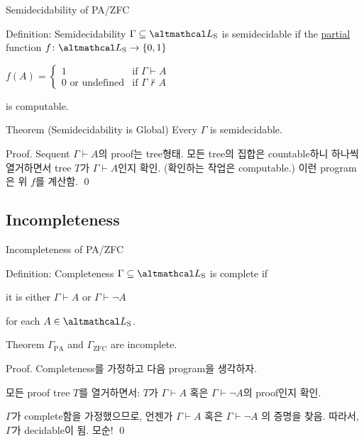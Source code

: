 \documentclass[../231120_msquare_computational-logic.tex]{subfiles}
\begin{document}
\begin{frame}{Semidecidability of PA/ZFC}
    \begin{block}{Definition: Semidecidability}
        \(\Gamma \subseteq \LS\) is semidecidable if the \ul{partial} function \(f \colon \LS \to \{0,1\}\)
        \centerline{
            \(f(A) = \begin{cases}
                1 & \text{if } \Gamma \vdash A \\
                0 \text{ or undefined} & \text{if }\Gamma \not\vdash A
            \end{cases}\)
        }
        is computable.
    \end{block}
    \pause

    \begin{block}{Theorem (Semidecidability is Global)}
        Every \(\Gamma\) is semidecidable.
    \end{block}
    \begin{block}{Proof.}
        Sequent \(\Gamma \vdash A\)의 proof는 tree형태.
        모든 tree의 집합은 countable하니 하나씩 열거하면서
        tree \(T\)가 \(\Gamma \vdash A\)인지 확인. (확인하는 작업은 computable.)
        이런 program은 위 \(f\)를 계산함. \qed
    \end{block}
\end{frame}

\subsection{Incompleteness}
\begin{frame}{Incompleteness of PA/ZFC}
    \begin{block}{Definition: Completeness}
        \(\Gamma \subseteq \LS\) is complete if
        \begin{itemize}
            \ii it is either \(\Gamma \vdash A\) or \(\Gamma \vdash \lnot A\)
        \end{itemize}
        for each \(A \in \LS\).
    \end{block}
    \pause

    \begin{block}{Theorem}
        \(\Gamma_\text{PA}\) and \(\Gamma_\text{ZFC}\) are incomplete.
    \end{block}
    \pause
    \begin{block}{Proof.}
        Completeness를 가정하고 다음 program을 생각하자.
        \begin{itemize}
            \ii 모든 proof tree \(T\)를 열거하면서:
            \ii \(T\)가 \(\Gamma \vdash A\) 혹은 \(\Gamma \vdash \lnot A\)의 proof인지 확인.
        \end{itemize}
        \(\Gamma\)가 complete함을 가정했으므로,
        언젠가 \(\Gamma \vdash A\) 혹은 \(\Gamma \vdash \lnot A\) 의 증명을 찾음.
        따라서, \(\Gamma\)가 decidable이 됨. 모순! \qed
    \end{block}
\end{frame}
\end{document}
